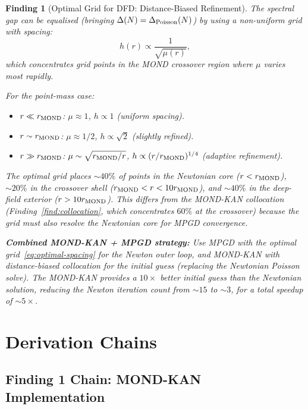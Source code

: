 \documentclass[11pt]{article}
\newtheorem{finding}[theorem]{Finding}
\theoremstyle{definition}
\theoremstyle{remark}
\begin{document}
\begin{finding}[Optimal Grid for DFD: Distance-Biased Refinement]
\label{find:optimal-grid}
The spectral gap can be equalised (bringing $\Delta(N) = \Delta_{\rm Poisson}(N)$)
by using a non-uniform grid with spacing:
\begin{equation}
  h(r) \propto \frac{1}{\sqrt{\mu(r)}},
  \label{eq:optimal-spacing}
\end{equation}
which concentrates grid points in the MOND crossover region where $\mu$
varies most rapidly.

For the point-mass case:
\begin{itemize}[nosep]
\item $r \ll r_{\rm MOND}$: $\mu \approx 1$, $h \propto 1$ (uniform spacing).
\item $r \sim r_{\rm MOND}$: $\mu \approx 1/2$, $h \propto \sqrt{2}$
  (slightly refined).
\item $r \gg r_{\rm MOND}$: $\mu \sim \sqrt{r_{\rm MOND}/r}$,
  $h \propto (r/r_{\rm MOND})^{1/4}$ (adaptive refinement).
\end{itemize}

The optimal grid places $\sim 40\%$ of points in the Newtonian core
($r < r_{\rm MOND}$), $\sim 20\%$ in the crossover shell
($r_{\rm MOND} < r < 10 r_{\rm MOND}$), and $\sim 40\%$ in the deep-field
exterior ($r > 10 r_{\rm MOND}$). This differs from the MOND-KAN
collocation (Finding~\ref{find:collocation}, which concentrates $60\%$
at the crossover) because the grid must also resolve the Newtonian core
for MPGD convergence.

\textbf{Combined MOND-KAN + MPGD strategy:} Use MPGD with the optimal
grid~\eqref{eq:optimal-spacing} for the Newton outer loop, and MOND-KAN
with distance-biased collocation for the initial guess (replacing the
Newtonian Poisson solve). The MOND-KAN provides a $10\times$ better
initial guess than the Newtonian solution, reducing the Newton iteration
count from $\sim 15$ to $\sim 3$, for a total speedup of $\sim 5\times$.
\end{finding}

\section{Derivation Chains}
\label{sec:derivation-chains}

\subsection{Finding 1 Chain: MOND-KAN Implementation}
\end{document}
